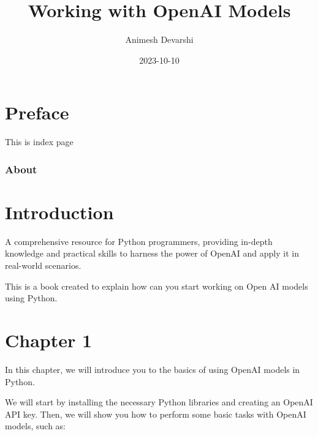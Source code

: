 \documentclass[
  letterpaper,
  DIV=11,
  numbers=noendperiod]{scrreprt}
\title{Working with OpenAI Models}
\author{Animesh Devarshi}
\date{2023-10-10}
\renewcommand*\contentsname{Table of contents}
\newcommand\contentsname{Table of contents}
\begin{document}
\maketitle
\ifdefined\Shaded\renewenvironment{Shaded}{\begin{tcolorbox}[enhanced, frame hidden, interior hidden, borderline west={3pt}{0pt}{shadecolor}, breakable, sharp corners, boxrule=0pt]}{\end{tcolorbox}}\fi

\renewcommand*\contentsname{Table of contents}
{
\hypersetup{linkcolor=}
\setcounter{tocdepth}{2}
\tableofcontents
}

\hypertarget{preface}{%
\chapter*{Preface}\label{preface}}


This is index page

\hypertarget{about}{%
\subsection*{About}\label{about}}


\hypertarget{introduction}{%
\chapter{Introduction}\label{introduction}}

A comprehensive resource for Python programmers, providing in-depth
knowledge and practical skills to harness the power of OpenAI and apply
it in real-world scenarios.

This is a book created to explain how can you start working on Open AI
models using Python.


\hypertarget{chapter-1}{%
\chapter{Chapter 1}\label{chapter-1}}

In this chapter, we will introduce you to the basics of using OpenAI
models in Python.

We will start by installing the necessary Python libraries and creating
an OpenAI API key. Then, we will show you how to perform some basic
tasks with OpenAI models, such as:
\end{document}
